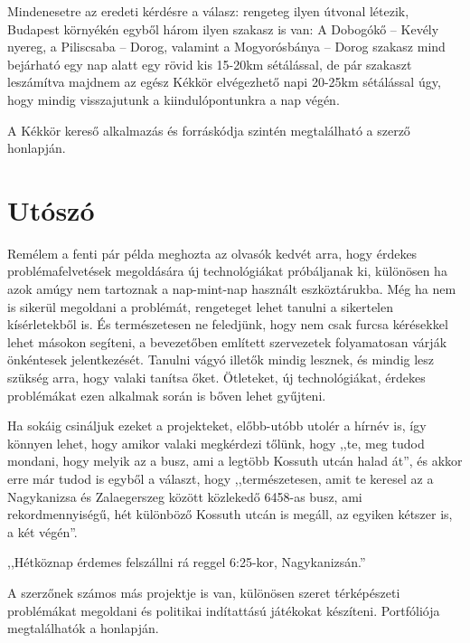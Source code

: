 \documentclass[a5paper,10pt]{article}
\begin{document}
Mindenesetre az eredeti kérdésre a válasz: rengeteg ilyen útvonal létezik, Budapest környékén egyből három ilyen szakasz is van: A Dobogókő -- Kevély nyereg, a Piliscsaba -- Dorog, valamint a Mogyorósbánya -- Dorog szakasz mind bejárható egy nap alatt egy rövid kis 15-20km sétálással, de pár szakaszt leszámítva majdnem az egész Kékkör elvégezhető napi 20-25km sétálással úgy, hogy mindig visszajutunk a kiindulópontunkra a nap végén.

\bigskip

A Kékkör kereső alkalmazás és forráskódja szintén megtalálható a szerző honlapján\cite{kekkor:site}.

\section{Utószó}

Remélem a fenti pár példa meghozta az olvasók kedvét arra, hogy érdekes problémafelvetések megoldására új technológiákat próbáljanak ki, különösen ha azok amúgy nem tartoznak a nap-mint-nap használt eszköztárukba. Még ha nem is sikerül megoldani a problémát, rengeteget lehet tanulni a sikertelen kísérletekből is. És természetesen ne feledjünk, hogy nem csak furcsa kérésekkel lehet másokon segíteni, a bevezetőben említett szervezetek folyamatosan várják önkéntesek jelentkezését. Tanulni vágyó illetők mindig lesznek, és mindig lesz szükség arra, hogy valaki tanítsa őket. Ötleteket, új technológiákat, érdekes problémákat ezen alkalmak során is bőven lehet gyűjteni.

\bigskip

Ha sokáig csináljuk ezeket a projekteket, előbb-utóbb utolér a hírnév is, így könnyen lehet, hogy amikor valaki megkérdezi tőlünk, hogy ,,te, meg tudod mondani, hogy melyik az a busz, ami a legtöbb Kossuth utcán halad át'', és akkor erre már tudod is egyből a választ, hogy ,,természetesen, amit te keresel az a Nagykanizsa és Zalaegerszeg között közlekedő 6458-as busz, ami rekordmennyiségű, hét különböző Kossuth utcán is megáll, az egyiken kétszer is, a két végén''.

\bigskip

,,Hétköznap érdemes felszállni rá reggel 6:25-kor, Nagykanizsán.''

\bigskip

A szerzőnek számos más projektje is van, különösen szeret térképészeti problémákat megoldani és politikai indítattású játékokat készíteni. Portfóliója megtalálhatók a honlapján\cite{sztupy:projects}.
\end{document}
